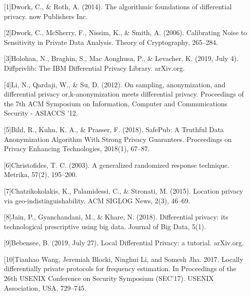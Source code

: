 \documentclass[inscr]{dithesis}
\begin{document}
{\huge }



\fontsize{10}{14}\selectfont
\setmainfont{Arial}

[1]\hspace{1cm}Dwork, C., & Roth, A. (2014). The algorithmic foundations of differential privacy. now Publishers Inc. 

[2]\hspace{1cm}Dwork, C., McSherry, F., Nissim, K., & Smith, A. (2006). Calibrating Noise to Sensitivity in Private Data Analysis. Theory of Cryptography, 265–284. 

[3]\hspace{1cm}Holohan, N., Braghin, S., Mac Aonghusa, P., & Levacher, K. (2019, July 4). Diffprivlib: The IBM Differential Privacy Library. arXiv.org. 

[4]\hspace{1cm}Li, N., Qardaji, W., & Su, D. (2012). On sampling, anonymization, and differential privacy or,k-anonymization meets differential privacy. Proceedings of the 7th ACM Symposium on Information, Computer and Communications Security - ASIACCS '12. 

[5]\hspace{1cm}Bild, R., Kuhn, K. A., & Prasser, F. (2018). SafePub: A Truthful Data Anonymization Algorithm With Strong Privacy Guarantees. Proceedings on Privacy Enhancing Technologies, 2018(1), 67–87.

[6]\hspace{1cm}Christofides, T. C. (2003). A generalized randomized response technique. Metrika, 57(2), 195–200. 

[7]\hspace{1cm}Chatzikokolakis, K., Palamidessi, C., & Stronati, M. (2015). Location privacy via geo-indistinguishability. ACM SIGLOG News, 2(3), 46–69. 

[8]\hspace{1cm}Jain, P., Gyanchandani, M., & Khare, N. (2018). Differential privacy: its technological prescriptive using big data. Journal of Big Data, 5(1). 

[9]\hspace{1cm}Bebensee, B. (2019, July 27). Local Differential Privacy: a tutorial. arXiv.org. 

[10]\hspace{1cm}Tianhao Wang, Jeremiah Blocki, Ninghui Li, and Somesh Jha. 2017. Locally differentially private protocols for frequency estimation. In Proceedings of the 26th USENIX Conference on Security Symposium (SEC'17). USENIX Association, USA, 729–745.
\end{document}
